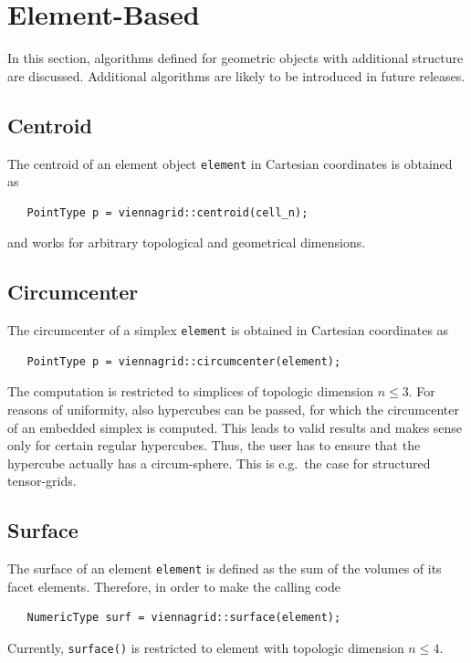 \section{Element-Based}
In this section, algorithms defined for geometric objects with additional structure are discussed. Additional algorithms are likely to be introduced in future releases.

  \subsection{Centroid}
  The centroid of an element object \lstinline|element| in Cartesian coordinates is obtained as
  \begin{lstlisting}
   PointType p = viennagrid::centroid(cell_n);
  \end{lstlisting}
  and works for arbitrary topological and geometrical dimensions.

  \subsection{Circumcenter}
  The circumcenter of a simplex \lstinline|element| is obtained in Cartesian coordinates as
  \begin{lstlisting}
   PointType p = viennagrid::circumcenter(element);
  \end{lstlisting}
  The computation is restricted to simplices of topologic dimension $n \leq 3$. For reasons of uniformity, also hypercubes can be passed, for which the circumcenter of an embedded simplex is computed. This leads to valid results and makes sense only for certain regular hypercubes.
  Thus, the user has to ensure that the hypercube actually has a circum-sphere. This is e.g.~the case for structured tensor-grids.


  \subsection{Surface}
  The surface of an element \lstinline|element| is defined as the sum of the volumes of its facet elements. Therefore, in order to make the calling code
  \begin{lstlisting}
   NumericType surf = viennagrid::surface(element);
  \end{lstlisting}
  Currently, \lstinline|surface()| is restricted to element with topologic dimension $n \leq 4$.

